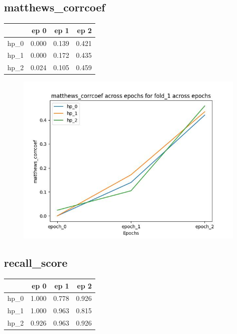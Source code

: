 \documentclass{article}
\begin{document}
\subsection{matthews\_corrcoef}
\begin{tabular}{lrrr}
\toprule
{} &   ep 0 &   ep 1 &   ep 2 \\
\midrule
hp\_0 &  0.000 &  0.139 &  0.421 \\
hp\_1 &  0.000 &  0.172 &  0.435 \\
hp\_2 &  0.024 &  0.105 &  0.459 \\
\bottomrule
\end{tabular}

\begin{figure}[H]
\includegraphics[scale = 0.75]{fold_1/matthews_corrcoef}
\end{figure}
\subsection{recall\_score}
\begin{tabular}{lrrr}
\toprule
{} &   ep 0 &   ep 1 &   ep 2 \\
\midrule
hp\_0 &  1.000 &  0.778 &  0.926 \\
hp\_1 &  1.000 &  0.963 &  0.815 \\
hp\_2 &  0.926 &  0.963 &  0.926 \\
\bottomrule
\end{tabular}
\end{document}
